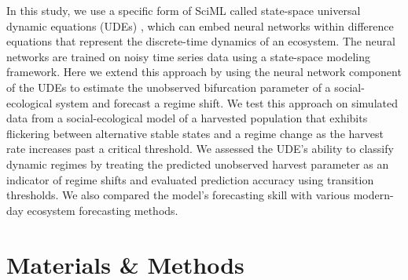 \documentclass[openacc]{rsproca_new}%
\begin{document}
In this study, we use a specific form of SciML called state-space universal dynamic equations (UDEs) \cite{jack_statespace}, which can embed neural networks within difference equations that represent the discrete-time dynamics of an ecosystem. The neural networks are trained on noisy time series data using a state-space modeling framework. Here we extend this approach by using the neural network component of the UDEs to estimate the unobserved bifurcation parameter of a social-ecological system and forecast a regime shift. We test this approach on simulated data from a social-ecological model of a harvested population that exhibits flickering between alternative stable states and a regime change as the harvest rate increases past a critical threshold. We assessed the UDE's ability to classify dynamic regimes by treating the predicted unobserved harvest parameter as an indicator of regime shifts and evaluated prediction accuracy using transition thresholds. We also compared the model's forecasting skill with various modern-day ecosystem forecasting methods.   
% 
% 
\section{Materials \& Methods}\label{methods}
\end{document}
